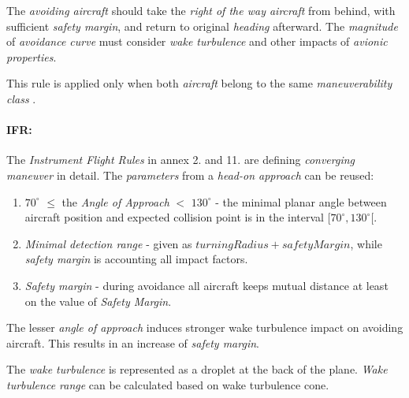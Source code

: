 The \emph{avoiding aircraft} should take the \emph{right of the way aircraft} from behind, with sufficient \emph{safety margin}, and return to original \emph{heading} afterward. The \emph{magnitude} of \emph{avoidance curve} must consider \emph{wake turbulence} and other impacts of \emph{avionic properties}.

\begin{note}
    This rule is applied only when both \emph{aircraft} belong to the same  \emph{maneuverability class} \cite{icaoAnnex2}.
\end{note}

\paragraph{IFR:} The \emph{Instrument Flight Rules} in annex 2. \cite{icaoAnnex2} and 11. \cite{icaoAnnex11} are defining \emph{converging maneuver} in detail. The \emph{parameters} from a \emph{head-on approach} can be reused:

\begin{enumerate}
    \item $70^\circ$ $\le$ the \emph{Angle of Approach} $<$ $130^\circ$ - the minimal planar angle between aircraft position and expected collision point is in the interval $[70^\circ , 130^\circ[$.
    
    \item\emph{Minimal detection range} - given as $turning Radius + safety Margin$, while \emph{safety margin} is accounting all impact factors. 
    
    \item\emph{Safety margin} - during avoidance all aircraft keeps mutual distance at least on the value of \emph{Safety Margin}.
\end{enumerate}

\begin{note}
The lesser \emph{angle of approach} induces stronger wake turbulence impact on avoiding aircraft. This results in an increase of \emph{safety margin}. 

The \emph{wake turbulence} is represented as a droplet at the back of the plane. \emph{Wake turbulence range} can be calculated based on wake turbulence cone.
\end{note}

